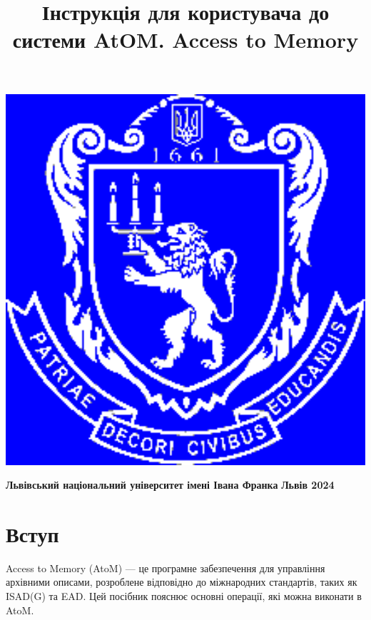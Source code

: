 \documentclass[14pt,a4paper]{article}
\title{\Huge \textbf{Інструкція для користувача  до системи AtOM. Access to Memory} }
\date{}
\begin{document}
\begin{titlepage}
    \pagecolor{blue} 
    \color{white}
    \maketitle
    \thispagestyle{empty}
    
	\begin{center}
	\includegraphics[max width=1.5\textwidth]{Images/logo_bl.png}
	\end{center}    
    
    \vspace*{8cm}
    \center \textbf{Львівський національний університет імені Івана Франка}
    \center \textbf{Львів 2024}

\end{titlepage}

\pagecolor{white}
\color{black}

\newpage

\tableofcontents
\newpage
{}
\section{Вступ}
Access to Memory (AtoM) — це програмне забезпечення для управління архівними описами, розроблене відповідно до міжнародних стандартів, таких як ISAD(G) та EAD. Цей посібник пояснює основні операції, які можна виконати в AtoM.
\end{document}
